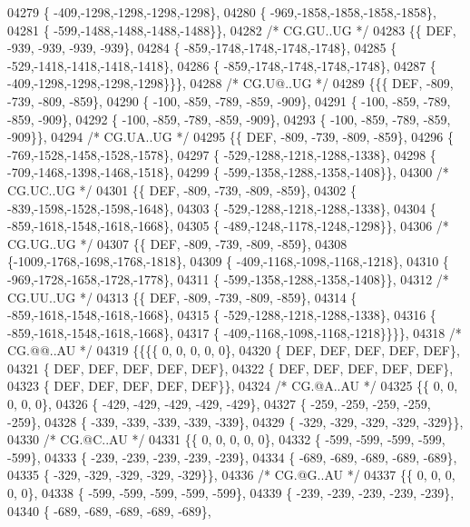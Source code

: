 \begin{DoxyCode}
04279 \{ -409,-1298,-1298,-1298,-1298\},
04280 \{ -969,-1858,-1858,-1858,-1858\},
04281 \{ -599,-1488,-1488,-1488,-1488\}\},
04282 \textcolor{comment}{/* CG.GU..UG */}
04283 \{\{  DEF, -939, -939, -939, -939\},
04284 \{ -859,-1748,-1748,-1748,-1748\},
04285 \{ -529,-1418,-1418,-1418,-1418\},
04286 \{ -859,-1748,-1748,-1748,-1748\},
04287 \{ -409,-1298,-1298,-1298,-1298\}\}\},
04288 \textcolor{comment}{/* CG.U@..UG */}
04289 \{\{\{  DEF, -809, -739, -809, -859\},
04290 \{ -100, -859, -789, -859, -909\},
04291 \{ -100, -859, -789, -859, -909\},
04292 \{ -100, -859, -789, -859, -909\},
04293 \{ -100, -859, -789, -859, -909\}\},
04294 \textcolor{comment}{/* CG.UA..UG */}
04295 \{\{  DEF, -809, -739, -809, -859\},
04296 \{ -769,-1528,-1458,-1528,-1578\},
04297 \{ -529,-1288,-1218,-1288,-1338\},
04298 \{ -709,-1468,-1398,-1468,-1518\},
04299 \{ -599,-1358,-1288,-1358,-1408\}\},
04300 \textcolor{comment}{/* CG.UC..UG */}
04301 \{\{  DEF, -809, -739, -809, -859\},
04302 \{ -839,-1598,-1528,-1598,-1648\},
04303 \{ -529,-1288,-1218,-1288,-1338\},
04304 \{ -859,-1618,-1548,-1618,-1668\},
04305 \{ -489,-1248,-1178,-1248,-1298\}\},
04306 \textcolor{comment}{/* CG.UG..UG */}
04307 \{\{  DEF, -809, -739, -809, -859\},
04308 \{-1009,-1768,-1698,-1768,-1818\},
04309 \{ -409,-1168,-1098,-1168,-1218\},
04310 \{ -969,-1728,-1658,-1728,-1778\},
04311 \{ -599,-1358,-1288,-1358,-1408\}\},
04312 \textcolor{comment}{/* CG.UU..UG */}
04313 \{\{  DEF, -809, -739, -809, -859\},
04314 \{ -859,-1618,-1548,-1618,-1668\},
04315 \{ -529,-1288,-1218,-1288,-1338\},
04316 \{ -859,-1618,-1548,-1618,-1668\},
04317 \{ -409,-1168,-1098,-1168,-1218\}\}\}\},
04318 \textcolor{comment}{/* CG.@@..AU */}
04319 \{\{\{\{    0,    0,    0,    0,    0\},
04320 \{  DEF,  DEF,  DEF,  DEF,  DEF\},
04321 \{  DEF,  DEF,  DEF,  DEF,  DEF\},
04322 \{  DEF,  DEF,  DEF,  DEF,  DEF\},
04323 \{  DEF,  DEF,  DEF,  DEF,  DEF\}\},
04324 \textcolor{comment}{/* CG.@A..AU */}
04325 \{\{    0,    0,    0,    0,    0\},
04326 \{ -429, -429, -429, -429, -429\},
04327 \{ -259, -259, -259, -259, -259\},
04328 \{ -339, -339, -339, -339, -339\},
04329 \{ -329, -329, -329, -329, -329\}\},
04330 \textcolor{comment}{/* CG.@C..AU */}
04331 \{\{    0,    0,    0,    0,    0\},
04332 \{ -599, -599, -599, -599, -599\},
04333 \{ -239, -239, -239, -239, -239\},
04334 \{ -689, -689, -689, -689, -689\},
04335 \{ -329, -329, -329, -329, -329\}\},
04336 \textcolor{comment}{/* CG.@G..AU */}
04337 \{\{    0,    0,    0,    0,    0\},
04338 \{ -599, -599, -599, -599, -599\},
04339 \{ -239, -239, -239, -239, -239\},
04340 \{ -689, -689, -689, -689, -689\},

\end{DoxyCode}
